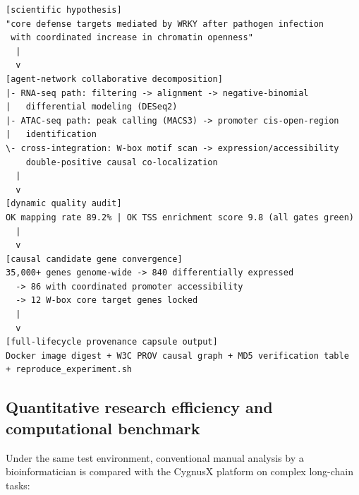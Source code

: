 \documentclass[11pt,a4paper]{article}
\begin{document}
\begin{verbatim}
[scientific hypothesis]
"core defense targets mediated by WRKY after pathogen infection
 with coordinated increase in chromatin openness"
  |
  v
[agent-network collaborative decomposition]
|- RNA-seq path: filtering -> alignment -> negative-binomial
|   differential modeling (DESeq2)
|- ATAC-seq path: peak calling (MACS3) -> promoter cis-open-region
|   identification
\- cross-integration: W-box motif scan -> expression/accessibility
    double-positive causal co-localization
  |
  v
[dynamic quality audit]
OK mapping rate 89.2% | OK TSS enrichment score 9.8 (all gates green)
  |
  v
[causal candidate gene convergence]
35,000+ genes genome-wide -> 840 differentially expressed
  -> 86 with coordinated promoter accessibility
  -> 12 W-box core target genes locked
  |
  v
[full-lifecycle provenance capsule output]
Docker image digest + W3C PROV causal graph + MD5 verification table
+ reproduce_experiment.sh
\end{verbatim}

\subsection{Quantitative research efficiency and computational benchmark}

Under the same test environment, conventional manual analysis by a bioinformatician is compared with the CygnusX platform on complex long-chain tasks:
\end{document}
